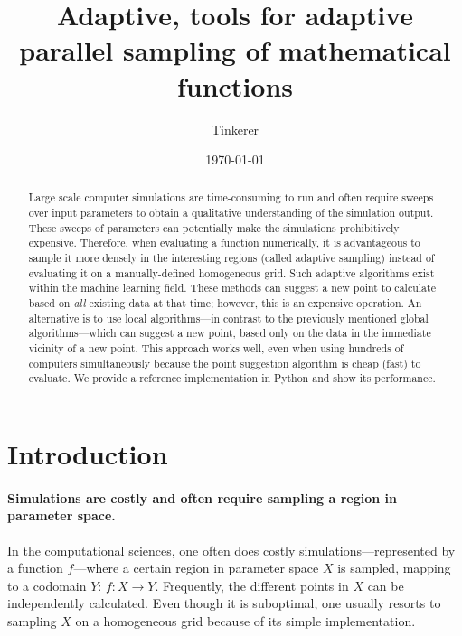 \documentclass[english, twocolumn, 10pt, aps, superscriptaddress, floatfix, prb, citeautoscript]{revtex4-1}
\begin{document}
\title{Adaptive, tools for adaptive parallel sampling of mathematical functions}

\author{Tinkerer}

\date{\today}

\begin{abstract}
Large scale computer simulations are time-consuming to run and often require sweeps over input parameters to obtain a qualitative understanding of the simulation output.
These sweeps of parameters can potentially make the simulations prohibitively expensive.
Therefore, when evaluating a function numerically, it is advantageous to sample it more densely in the interesting regions (called adaptive sampling) instead of evaluating it on a manually-defined homogeneous grid.
Such adaptive algorithms exist within the machine learning field.
These methods can suggest a new point to calculate based on \textit{all} existing data at that time; however, this is an expensive operation.
An alternative is to use local algorithms---in contrast to the previously mentioned global algorithms---which can suggest a new point, based only on the data in the immediate vicinity of a new point.
This approach works well, even when using hundreds of computers simultaneously because the point suggestion algorithm is cheap (fast) to evaluate.
We provide a reference implementation in Python and show its performance.
\end{abstract}

\flushbottom
\maketitle

\section{Introduction}

\paragraph{Simulations are costly and often require sampling a region in parameter space.}

In the computational sciences, one often does costly simulations---represented by a function \(f\)---where a certain region in parameter space \(X\) is sampled, mapping to a codomain \(Y\): \(f \colon X \to Y\).
Frequently, the different points in \(X\) can be independently calculated.
Even though it is suboptimal, one usually resorts to sampling \(X\) on a homogeneous grid because of its simple implementation.
\end{document}
